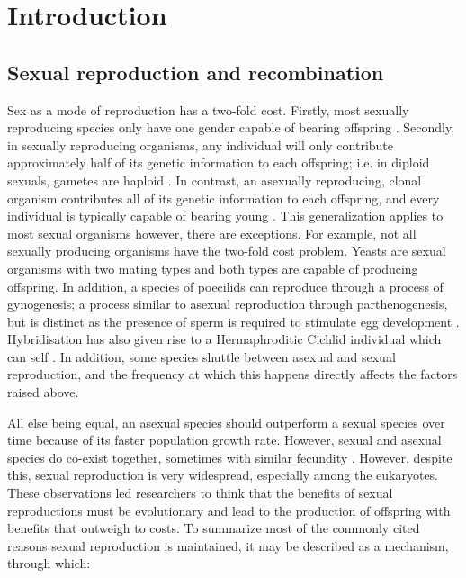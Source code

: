 \section{Introduction}

\subsection{Sexual reproduction and recombination}

Sex as a mode of reproduction has a two-fold cost.
Firstly, most sexually reproducing species only have one gender capable of bearing offspring \parencite{DeVisser2007}.
Secondly, in sexually reproducing organisms, any individual will only contribute approximately half of its genetic information to each offspring; i.e. in diploid sexuals, gametes are haploid \parencite{Agrawal2001}.
In contrast, an asexually reproducing, clonal organism contributes all of its genetic information to each offspring, and every individual is typically capable of bearing young \parencite{Schlupp2010}.
This generalization applies to most sexual organisms however, there are exceptions. 
For example, not all sexually producing organisms have the two-fold cost problem. 
Yeasts are sexual organisms with two mating types and both types are capable of producing offspring.
In addition, a species of poecilids can reproduce through a process of gynogenesis; a process similar to asexual reproduction through parthenogenesis, but is distinct as the presence of sperm is required to stimulate egg development \parencite{Schlupp2010}.
Hybridisation has also given rise to a Hermaphroditic Cichlid individual which can self \parencite{Svensson2016}.
In addition, some species shuttle between asexual and sexual reproduction, and the frequency at which this happens directly affects the factors raised above.

All else being equal, an asexual species should outperform a sexual species over time because of its faster population growth rate.
However, sexual and asexual species do co-exist together, sometimes with similar fecundity \parencite{Schlupp2010}.
However, despite this, sexual reproduction is very widespread, especially among the eukaryotes.
These observations led researchers to think that the benefits of sexual reproductions must be evolutionary and lead to the production of offspring with benefits that outweigh to costs.
To summarize most of the commonly cited reasons sexual reproduction is maintained, it may be described as a mechanism, through which: 

